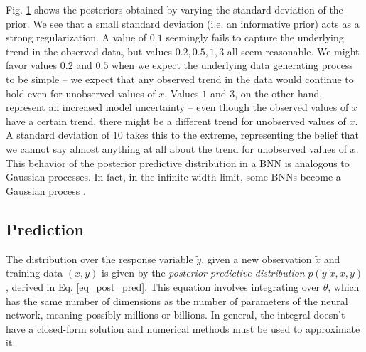 \documentclass[12pt]{article}
\begin{document}
{Fig. \ref{fig_1d_predictions_by_stdev} shows the posteriors obtained by varying the standard deviation of the prior. We see that a small standard deviation (i.e. an informative prior) acts as a strong regularization. A value of $0.1$ seemingly fails to capture the underlying trend in the observed data, but values $0.2, 0.5, 1, 3$ all seem reasonable. We might favor values $0.2$ and $0.5$ when we expect the underlying data generating process to be simple -- we expect that any observed trend in the data would continue to hold even for unobserved values of $x$. Values $1$ and $3$, on the other hand, represent an increased model uncertainty -- even though the observed values of $x$ have a certain trend, there might be a different trend for unobserved values of $x$. A standard deviation of $10$ takes this to the extreme, representing the belief that we cannot say almost anything at all about the trend for unobserved values of $x$. This behavior of the posterior predictive distribution in a BNN is analogous to Gaussian processes. In fact, in the infinite-width limit, some BNNs become a Gaussian process \cite{neural_tangents}.

\begin{figure}[ht]
\centering
{}
\caption{}
\label{fig_1d_predictions_by_stdev}
\end{figure}

\subsection{Prediction}
\label{sec_prediction}

The distribution over the response variable $\tilde{y}$, given a new observation $\tilde{x}$ and training data $(x, y)$ is given by the \textit{posterior predictive distribution} $p(\tilde{y} | \tilde{x}, x, y)$, derived in Eq. \ref{eq_post_pred}. This equation involves integrating over $\theta$, which has the same number of dimensions as the number of parameters of the neural network, meaning possibly millions or billions. In general, the integral doesn't have a closed-form solution and numerical methods must be used to approximate it.

}
\end{document}
